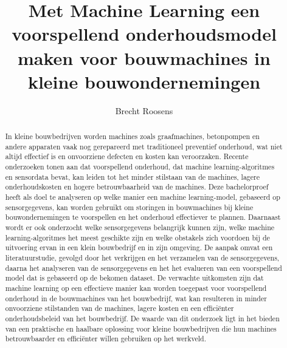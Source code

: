 \documentclass{hogent-article}
\title{Met Machine Learning een voorspellend onderhoudsmodel maken voor bouwmachines in kleine bouwondernemingen}
\author{Brecht Roosens}
\begin{document}
\begin{abstract}
  In kleine bouwbedrijven worden machines zoals graafmachines, betonpompen en andere apparaten vaak nog gerepareerd met traditioneel preventief onderhoud, wat niet altijd effectief is en onvoorziene defecten en kosten kan veroorzaken. Recente onderzoeken tonen aan dat voorspellend onderhoud, dat machine learning-algoritmes en sensordata bevat, kan leiden tot het minder stilstaan van de machines, lagere onderhoudskosten en hogere betrouwbaarheid van de machines. Deze bachelorproef heeft als doel te analyseren op welke manier een machine learning-model, gebaseerd op sensorgegevens, kan worden gebruikt om storingen in bouwmachines bij kleine bouwondernemingen te voorspellen en het onderhoud effectiever  te plannen. Daarnaast wordt er ook onderzocht welke sensorgegevens belangrijk kunnen zijn, welke machine learning-algoritmes het meest geschikte zijn en welke obstakels zich voordoen bij de uitvoering ervan in een klein bouwbedrijf en in zijn omgeving. De aanpak omvat een literatuurstudie, gevolgd door het verkrijgen en het verzamelen van de sensorgegevens, daarna het analyseren van de sensorgegevens en het het evalueren van een voorspellend model dat is gebaseerd op de bekomen dataset. De verwachte uitkomsten zijn dat machine learning op een effectieve manier kan worden toegepast voor voorspellend onderhoud in de bouwmachines van het bouwbedrijf, wat kan resulteren in minder onvoorziene stilstanden van de machines, lagere kosten en een efficiënter onderhoudsbeleid van het bouwbedrijf. De waarde van dit onderzoek ligt in het bieden van een praktische en haalbare oplossing voor kleine bouwbedrijven die hun machines betrouwbaarder en efficiënter willen gebruiken op het werkveld. 
\end{abstract}

\tableofcontents



\printbibliography[heading=bibintoc]
\end{document}
